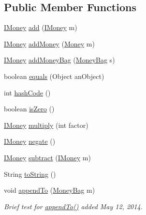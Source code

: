 \subsection*{Public Member Functions}
\begin{DoxyCompactItemize}
\item 
\hyperlink{interfacees_1_1deusto_1_1testing_1_1junit_1_1_i_money}{I\+Money} \hyperlink{classes_1_1deusto_1_1testing_1_1junit_1_1_money_bag_ab3be83ff12fa6d19b67b669194120d00}{add} (\hyperlink{interfacees_1_1deusto_1_1testing_1_1junit_1_1_i_money}{I\+Money} m)
\item 
\hyperlink{interfacees_1_1deusto_1_1testing_1_1junit_1_1_i_money}{I\+Money} \hyperlink{classes_1_1deusto_1_1testing_1_1junit_1_1_money_bag_a06ecedbf53ba09d34276fe177e3169bc}{add\+Money} (\hyperlink{classes_1_1deusto_1_1testing_1_1junit_1_1_money}{Money} m)
\item 
\hyperlink{interfacees_1_1deusto_1_1testing_1_1junit_1_1_i_money}{I\+Money} \hyperlink{classes_1_1deusto_1_1testing_1_1junit_1_1_money_bag_ab329e6a2811b83a2b1670b79be92249d}{add\+Money\+Bag} (\hyperlink{classes_1_1deusto_1_1testing_1_1junit_1_1_money_bag}{Money\+Bag} s)
\item 
boolean \hyperlink{classes_1_1deusto_1_1testing_1_1junit_1_1_money_bag_a80926d10c9619bd2ad84eabe52ca03bb}{equals} (Object an\+Object)
\item 
int \hyperlink{classes_1_1deusto_1_1testing_1_1junit_1_1_money_bag_ae2c0d290a37a617f0a07134bf95162eb}{hash\+Code} ()
\item 
boolean \hyperlink{classes_1_1deusto_1_1testing_1_1junit_1_1_money_bag_abebc5bc39c3343cb3c4e5fb291fd5893}{is\+Zero} ()
\item 
\hyperlink{interfacees_1_1deusto_1_1testing_1_1junit_1_1_i_money}{I\+Money} \hyperlink{classes_1_1deusto_1_1testing_1_1junit_1_1_money_bag_aa20ce4cc70c2ba0bc9a5ccb96635d506}{multiply} (int factor)
\item 
\hyperlink{interfacees_1_1deusto_1_1testing_1_1junit_1_1_i_money}{I\+Money} \hyperlink{classes_1_1deusto_1_1testing_1_1junit_1_1_money_bag_abf06bf97e548f95038756608fe0c8351}{negate} ()
\item 
\hyperlink{interfacees_1_1deusto_1_1testing_1_1junit_1_1_i_money}{I\+Money} \hyperlink{classes_1_1deusto_1_1testing_1_1junit_1_1_money_bag_a7f1803fe267edca895cdf752b5f46560}{subtract} (\hyperlink{interfacees_1_1deusto_1_1testing_1_1junit_1_1_i_money}{I\+Money} m)
\item 
String \hyperlink{classes_1_1deusto_1_1testing_1_1junit_1_1_money_bag_a85b49bdc3ff191abdaa1ad1a065ec5f1}{to\+String} ()
\item 
void \hyperlink{classes_1_1deusto_1_1testing_1_1junit_1_1_money_bag_ac8a5877b35b12939ce14543872ed18af}{append\+To} (\hyperlink{classes_1_1deusto_1_1testing_1_1junit_1_1_money_bag}{Money\+Bag} m)
\begin{DoxyCompactList}\small\item\em Brief test for \hyperlink{classes_1_1deusto_1_1testing_1_1junit_1_1_money_bag_ac8a5877b35b12939ce14543872ed18af}{append\+To()} added May 12, 2014. \end{DoxyCompactList}\end{DoxyCompactItemize}

